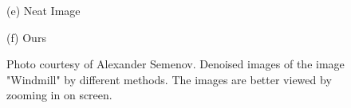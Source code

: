\documentclass[runningheads]{llncs}
\begin{document}
\begin{figure}
{\begin{minipage}[t]{0.25\textwidth}
{\footnotesize (e) Neat Image}
\end{minipage}
\begin{minipage}[t]{0.25\textwidth}
\centering
{}
{\footnotesize (f) Ours }
\end{minipage}
}
\caption{Photo courtesy of Alexander Semenov. Denoised images of the image "Windmill" by different methods. The images are better viewed by zooming in on screen.}
\label{fig11}
\end{figure}
\end{document}
